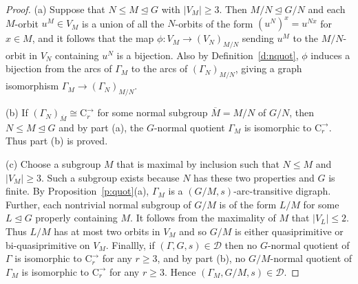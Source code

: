 \documentclass[10pt,a4paper]{amsart}
\newcommand{\C}{{\mathrm{C}}}
\newcommand\DD{{\mathscr{D}}}
\begin{document}
\begin{proof}
    (a) Suppose that $N\leqslant M\unlhd G$ with $|V_M|\geqslant3$. Then $M/N\unlhd G/N$ and each $M$-orbit $u^M\in V_M$ is a union of all the $N$-orbits of the form $(u^N)^x=u^{Nx}$ for $x\in M$, and it follows that the map $\phi:V_M\to (V_N)_{M/N}$ sending $u^M$ to the $M/N$-orbit in $V_N$ containing $u^N$ is a bijection. Also by Definition~\ref{d:nquot}, $\phi$ induces a bijection from the arcs of $\Gamma_M$ to the arcs of $(\Gamma_N)_{M/N}$, giving a graph isomorphism $\Gamma_M\to  (\Gamma_N)_{M/N}$.

    (b) If $(\Gamma_N)_{\overline{M}}\cong \C^{\to}_r$ for some normal subgroup $\overline{M}=M/N$ of $G/N$, then $N\leqslant M\unlhd G$ and by part (a), the $G$-normal quotient $\Gamma_M$ is isomorphic to $\C^{\to}_r$. Thus part (b) is proved.

    (c) Choose a subgroup $M$ that is maximal by inclusion such that $N\leqslant M$ and $|V_M|\geqslant 3$. Such a subgroup exists because $N$ has these two properties and $G$ is finite. By Proposition~\ref{p:quot}(a), $\Gamma_M$ is a $(G/M,s)$-arc-transitive digraph. Further, each nontrivial normal subgroup of $G/M$ is of the form $L/M$ for some $L\unlhd G$ properly containing $M$. It follows from the maximality of $M$ that $|V_L|\leq 2$. Thus $L/M$ has at most two orbits in $V_M$ and so $G/M$ is either quasiprimitive or bi-quasiprimitive on $V_M$.  Finallly,  if $(\Gamma, G, s)\in\DD$ then  no $G$-normal quotient of $\Gamma$ is isomorphic to $\C^{\to}_r$ for any $r\geq3$, and by part (b),  no $G/M$-normal quotient of $\Gamma_M$ is isomorphic to $\C^{\to}_r$ for any $r\geq3$. Hence $(\Gamma_M, G/M, s)\in\DD$.
\end{proof}
\end{document}
